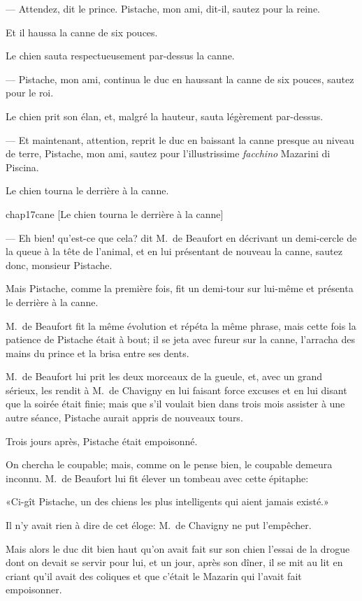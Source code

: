 — Attendez, dit le prince. Pistache, mon ami, dit-il, sautez pour la reine.

Et il haussa la canne de six pouces.

Le chien sauta respectueusement par-dessus la canne.

— Pistache, mon ami, continua le duc en haussant la canne de six pouces, sautez pour le roi.

Le chien prit son élan, et, malgré la hauteur, sauta légèrement par-dessus.

— Et maintenant, attention, reprit le duc en baissant la canne presque au niveau de terre, Pistache, mon ami, sautez pour l'illustrissime \textit{facchino} Mazarini di Piscina.

Le chien tourna le derrière à la canne.

\begin{bwbigpic}
	[\basicscale] 
	{chap17cane}
	[Le chien tourna le derrière à la canne]
\end{bwbigpic}

— Eh bien! qu'est-ce que cela? dit M.~de Beaufort en décrivant un demi-cercle de la queue à la tête de l'animal, et en lui présentant de nouveau la canne, sautez donc, monsieur Pistache.

Mais Pistache, comme la première fois, fit un demi-tour sur lui-même et présenta le derrière à la canne.

M.~de Beaufort fit la même évolution et répéta la même phrase, mais cette fois la patience de Pistache était à bout; il se jeta avec fureur sur la canne, l'arracha des mains du prince et la brisa entre ses dents.

M.~de Beaufort lui prit les deux morceaux de la gueule, et, avec un grand sérieux, les rendit à M.~de Chavigny en lui faisant force excuses et en lui disant que la soirée était finie; mais que s'il voulait bien dans trois mois assister à une autre séance, Pistache aurait appris de nouveaux tours.

Trois jours après, Pistache était empoisonné.

On chercha le coupable; mais, comme on le pense bien, le coupable demeura inconnu. M.~de Beaufort lui fit élever un tombeau avec cette épitaphe:

«Ci-gît Pistache, un des chiens les plus intelligents qui aient jamais existé.»

Il n'y avait rien à dire de cet éloge: M.~de Chavigny ne put l'empêcher.

Mais alors le duc dit bien haut qu'on avait fait sur son chien l'essai de la drogue dont on devait se servir pour lui, et un jour, après son dîner, il se mit au lit en criant qu'il avait des coliques et que c'était le Mazarin qui l'avait fait empoisonner.

